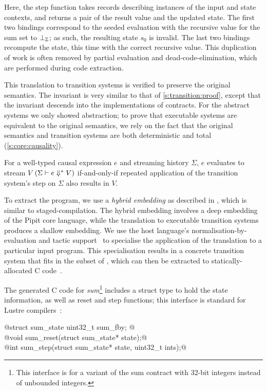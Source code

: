 Here, the step function takes records describing instances of the input and state contexts, and returns a pair of the result value and the updated state.
The first two bindings correspond to the seeded evaluation with the recursive value for the sum set to $\bot_{\mathbb{Z}}$; as such, the resulting state $s_0$ is invalid.
The last two bindings recompute the state, this time with the correct recursive value.
This duplication of work is often removed by partial evaluation and dead-code-elimination, which are performed during code extraction.

This translation to transition systems is verified to preserve the original semantics.
The invariant is very similar to that of \autoref{s:transition:proof}, except that the invariant descends into the implementations of contracts.
For the abstract systems we only showed abstraction; to prove that executable systems are equivalent to the original semantics, we rely on the fact that the original semantics and transition systems are both deterministic and total (\autoref{s:core:causality}).

\begin{theorem}
  For a well-typed causal expression $e$ and streaming history $\Sigma$, $e$ evaluates to stream $V$ $(\Sigma \vdash e \Downarrow^{*} V)$ if-and-only-if repeated application of the transition system's step on $\Sigma$ also results in $V$.
\end{theorem}

To extract the program, we use a \emph{hybrid embedding} as described in \cite{ho2022noise}, which is similar to staged-compilation.
The hybrid embedding involves a deep embedding of the Pipit core language, while the translation to executable transition systems produces a shallow embedding.
We use the \fstar{} host language's normalisation-by-evaluation and tactic support~\cite{martinez2019meta} to specialise the application of the translation to a particular input program.
This specialisation results in a concrete transition system that fits in the \lowstar{} subset of \fstar{}, which can then be extracted to statically-allocated C code~\cite{protzenko2017verified}.

The generated C code for \emph{sum}\footnote{This interface is for a variant of the sum contract with 32-bit integers instead of unbounded integers.} includes a struct type to hold the state information, as well as reset and step functions; this interface is standard for Lustre compilers~\cite{bourke2017formally,gerard2012modular}:
  \begin{tabbing}
    @struct sum_state { uint32_t sum_fby; }@ \\
    @void   sum_reset(struct sum_state* state);@ \\
    @int    sum_step(struct sum_state* state, uint32_t ints);@
  \end{tabbing}

